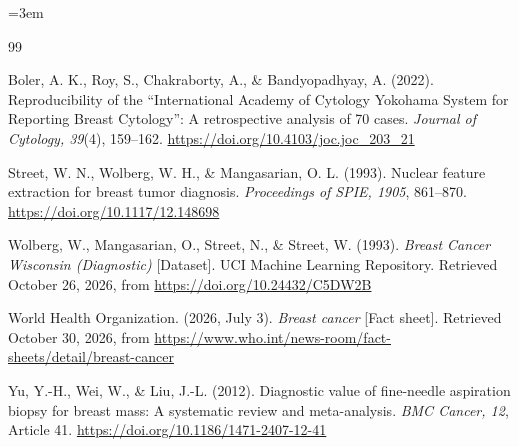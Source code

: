 \documentclass[12pt,a4paper]{article}
\begin{document}
\newpage
{}
\emergencystretch=3em
\begin{thebibliography}{99}

Boler, A. K., Roy, S., Chakraborty, A., \& Bandyopadhyay, A. (2022). Reproducibility of the ``International Academy of Cytology Yokohama System for Reporting Breast Cytology'': A retrospective analysis of 70 cases. \textit{Journal of Cytology, 39}(4), 159--162. \url{https://doi.org/10.4103/joc.joc_203_21}

Street, W. N., Wolberg, W. H., \& Mangasarian, O. L. (1993). Nuclear feature extraction for breast tumor diagnosis. \textit{Proceedings of SPIE, 1905}, 861--870. \url{https://doi.org/10.1117/12.148698}

Wolberg, W., Mangasarian, O., Street, N., \& Street, W. (1993). \textit{Breast Cancer Wisconsin (Diagnostic)} [Dataset]. UCI Machine Learning Repository. Retrieved October 26, 2026, from \url{https://doi.org/10.24432/C5DW2B}

World Health Organization. (2026, July 3). \textit{Breast cancer} [Fact sheet]. Retrieved October 30, 2026, from \url{https://www.who.int/news-room/fact-sheets/detail/breast-cancer}

Yu, Y.-H., Wei, W., \& Liu, J.-L. (2012). Diagnostic value of fine-needle aspiration biopsy for breast mass: A systematic review and meta-analysis. \textit{BMC Cancer, 12}, Article 41. \url{https://doi.org/10.1186/1471-2407-12-41}

\end{thebibliography}
\end{document}
